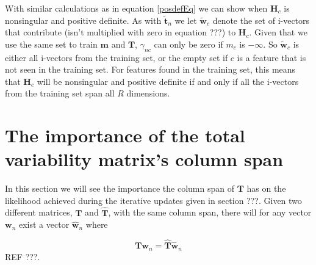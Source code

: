 With similar calculations as in equation \ref{posdefEq} we can show when $\mathbf{H}_c$ is nonsingular and positive definite. As with $\mathbf{\tilde{t}}_n$ we let $\mathbf{\tilde{w}}_c$ denote the set of i-vectors that contribute (isn't multiplied with zero in equation ???) to $\mathbf{H}_c$. Given that we use the same set to train $\mathbf{m}$ and $\mathbf{T}$, $\gamma_{nc}$ can only be zero if $m_c$ is $-\infty$. So $\mathbf{\tilde{w}}_c$ is either all i-vectors from the training set, or the empty set if $c$ is a feature that is not seen in the training set. For features found in the training set, this means that $\mathbf{H}_c$ will be nonsingular and positive definite if and only if all the i-vectors from the training set span all $R$ dimensions.

\section{The importance of the total variability matrix's column span}

In this section we will see the importance the column span of $\mathbf{T}$ has on the likelihood achieved during the iterative updates given in section ???. Given two different matrices, $\mathbf{T}$ and $\mathbf{\hat{T}}$, with the same column span, there will for any vector $\mathbf{w}_n$ exist a vector $\mathbf{\hat{w}}_n$ where 

\begin{equation}
\label{colpropEq}
\mathbf{Tw}_n = \mathbf{\hat{T}\hat{w}}_n
\end{equation}
REF ???.
